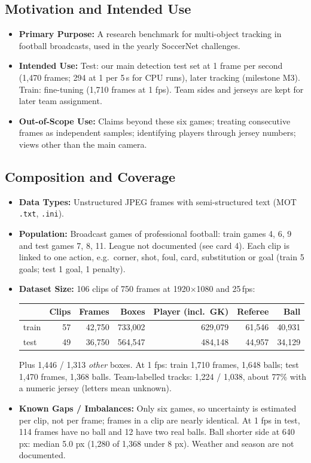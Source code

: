 \documentclass[11pt, a4paper]{article}
\begin{document}
\subsection{Motivation and Intended Use}
\begin{itemize}
    \item \textbf{Primary Purpose:} A research benchmark for multi-object tracking in football broadcasts, used in the yearly SoccerNet challenges.
    \item \textbf{Intended Use:} Test: our main detection test set at 1 frame per second (1,470 frames; 294 at 1 per 5\,s for CPU runs), later tracking (milestone M3). Train: fine-tuning (1,710 frames at 1 fps). Team sides and jerseys are kept for later team assignment.
    \item \textbf{Out-of-Scope Use:} Claims beyond these six games; treating consecutive frames as independent samples; identifying players through jersey numbers; views other than the main camera.
\end{itemize}

\subsection{Composition and Coverage}
\begin{itemize}
    \item \textbf{Data Types:} Unstructured JPEG frames with semi-structured text (MOT \texttt{.txt}, \texttt{.ini}).
    \item \textbf{Population:} Broadcast games of professional football: train games 4, 6, 9 and test games 7, 8, 11. League not documented (see card 4). Each clip is linked to one action, e.g.\ corner, shot, foul, card, substitution or goal (train 5 goals; test 1 goal, 1 penalty).
    \item \textbf{Dataset Size:} 106 clips of 750 frames at 1920$\times$1080 and 25\,fps:

    \begin{center}\small
    \begin{tabular}{@{}lrrrrrr@{}}
    \toprule
    & Clips & Frames & Boxes & Player (incl.\ GK) & Referee & Ball \\
    \midrule
    train & 57 & 42,750 & 733,002 & 629,079 & 61,546 & 40,931 \\
    test & 49 & 36,750 & 564,547 & 484,148 & 44,957 & 34,129 \\
    \bottomrule
    \end{tabular}
    \end{center}
    Plus 1,446 / 1,313 \emph{other} boxes. At 1 fps: train 1,710 frames, 1,648 balls; test 1,470 frames, 1,368 balls. Team-labelled tracks: 1,224 / 1,038, about 77\% with a numeric jersey (letters mean unknown).
    \item \textbf{Known Gaps / Imbalances:} Only six games, so uncertainty is estimated per clip, not per frame; frames in a clip are nearly identical. At 1 fps in test, 114 frames have no ball and 12 have two real balls. Ball shorter side at 640 px: median 5.0 px (1,280 of 1,368 under 8 px). Weather and season are not documented.
\end{itemize}
\end{document}
